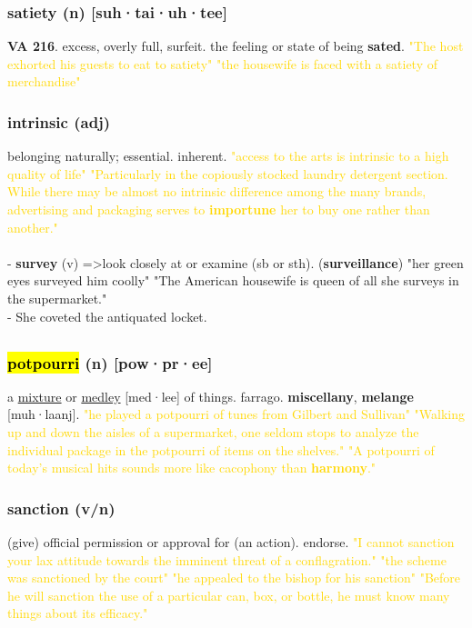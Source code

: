 \documentclass{proc}
\begin{document}
	\subsubsection{\textcolor{brickred}{satiety} (n) [suh·tai·uh·tee]}
	\textbf{VA 216}. excess, overly full, surfeit. the feeling or state of being \textbf{sated}.
	\textcolor{gold}{"The host exhorted his guests to eat to satiety" "the housewife is faced with a satiety of merchandise"}
	
	\subsubsection{\textcolor{brickred}{intrinsic} (adj)}
	belonging naturally; essential. inherent.
	\textcolor{gold}{"access to the arts is intrinsic to a high quality of life" "Particularly in the copiously stocked laundry detergent section. While there may be almost no intrinsic difference among the many brands, advertising and packaging serves to \textbf{importune} her to buy one rather than another."}\\\\
	- \textbf{survey} (v) =\textgreater look closely at or examine (sb or sth). (\textbf{surveillance}) "her green eyes surveyed him coolly" "The American housewife is queen of all she surveys in the supermarket."\\
	- She coveted the antiquated locket.
	
	\newpage
	\subsection{}
	\subsubsection{\textcolor{brickred}{\hl{potpourri}} (n) [pow·pr·ee]}
	a \underline{mixture} or \underline{medley} [med·lee] of things. farrago. \textbf{miscellany}, \textbf{melange} [muh·laanj].
	\textcolor{gold}{"he played a potpourri of tunes from Gilbert and Sullivan" "Walking up and down the aisles of a supermarket, one seldom stops to analyze the individual package in  the potpourri of items on  the shelves." "A potpourri of today's musical hits sounds more like cacophony than \textbf{harmony}."}
	
	\subsubsection{\textcolor{brickred}{sanction} (v/n)}
	(give) official permission or approval for (an action). endorse.
	\textcolor{gold}{"I cannot sanction your lax attitude towards the imminent threat of a conflagration." "the scheme was sanctioned by the court" "he appealed to the bishop for his sanction" "Before he will sanction the use of a particular can, box, or bottle, he must know many things about its efficacy."}
	
\end{document}
